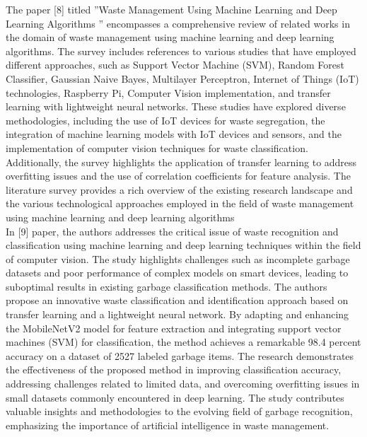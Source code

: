 \documentclass[12pt, English]{article}
\begin{document}
The paper [8] titled ”Waste Management Using Machine Learning and Deep
Learning Algorithms ” encompasses a comprehensive review of related works in the domain of waste management using machine learning and deep learning algorithms. The survey includes references to various studies that have employed different approaches, such as Support Vector Machine (SVM), Random Forest Classifier, Gaussian Naive Bayes, Multilayer Perceptron, Internet of Things (IoT) technologies, Raspberry Pi, Computer Vision implementation, and transfer learning
with lightweight neural networks. These studies have explored diverse methodologies, including the use of IoT devices for waste segregation, the integration of machine learning models with IoT devices and sensors, and the implementation of computer vision techniques for waste classification. Additionally, the survey
highlights the application of transfer learning to address overfitting issues and the use of correlation coefficients for feature analysis. The literature survey provides a rich overview of the existing research landscape and the various technological
approaches employed in the field of waste management using machine learning and deep learning algorithms\\

In [9] paper, the authors addresses the critical issue of waste recognition and classification using machine learning and deep learning techniques within the field of computer vision. The study highlights challenges such as incomplete garbage datasets and poor performance of complex models on smart devices, leading to suboptimal results in existing garbage classification methods. The authors
propose an innovative waste classification and identification approach based on transfer learning and a lightweight neural network. By adapting and enhancing the MobileNetV2 model for feature extraction and integrating support vector machines (SVM) for classification, the method achieves a remarkable 98.4 percent
accuracy on a dataset of 2527 labeled garbage items. The research demonstrates the effectiveness of the proposed method in improving classification accuracy, addressing challenges related to limited data, and overcoming overfitting issues in small datasets commonly encountered in deep learning. The study contributes valuable insights and methodologies to the evolving field of garbage recognition,
emphasizing the importance of artificial intelligence in waste management.\\
\end{document}
